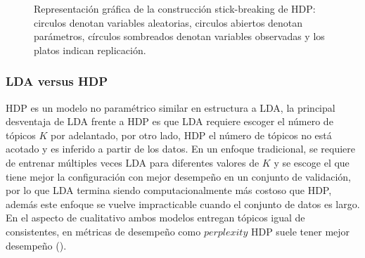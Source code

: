 \documentclass[letterpaper,12pt,oneside]{book} %
\begin{document}
\begin{figure}
  \centering
\caption{Representación gráfica de la construcción stick-breaking de HDP: circulos denotan variables aleatorias, circulos abiertos denotan parámetros, círculos sombreados denotan variables observadas y los platos indican replicación.}
\label{img:hdp_sbc}
\end{figure}

\subsubsection{LDA versus HDP}
HDP es un modelo no paramétrico similar en estructura a LDA, la principal desventaja de LDA frente a HDP es que LDA requiere escoger el número de tópicos $K$ por adelantado, por otro lado, HDP el número de tópicos no está acotado y es inferido a partir de los datos. En un enfoque tradicional, se requiere de entrenar múltiples veces LDA para diferentes valores de $K$ y se escoge el que tiene mejor la configuración con mejor desempeño en un conjunto de validación, por lo que LDA termina siendo computacionalmente más costoso que HDP, además este enfoque se vuelve impracticable cuando el conjunto de datos es largo. En el aspecto de cualitativo ambos modelos entregan tópicos igual de consistentes, en métricas de desempeño como $\textit{perplexity}$ HDP suele tener mejor desempeño (\cite{teh2005sharing}).
\end{document}
